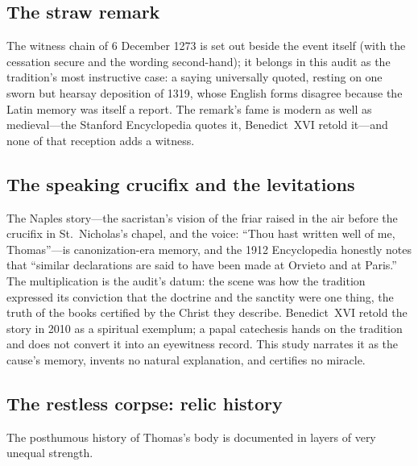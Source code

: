 \subsection{The straw remark}

The witness chain of 6 December 1273 is set out beside the event itself
(with the cessation secure and the wording second-hand); it belongs in
this audit as the tradition's most instructive case: a saying
universally quoted, resting on one sworn but hearsay deposition of
1319, whose English forms disagree because the Latin memory was itself
a report. The remark's fame is modern as well as medieval---the
Stanford Encyclopedia quotes it, Benedict~XVI retold it---and none of
that reception adds a witness.

\subsection{The speaking crucifix and the levitations}

The Naples story---the sacristan's vision of the friar raised in the
air before the crucifix in St.~Nicholas's chapel, and the voice: ``Thou
hast written well of me, Thomas''---is canonization-era memory, and the
1912 Encyclopedia honestly notes that ``similar declarations are said
to have been made at Orvieto and at Paris.'' The multiplication is the
audit's datum: the scene was how the tradition expressed its conviction
that the doctrine and the sanctity were one thing, the truth of the
books certified by the Christ they describe. Benedict~XVI retold the
story in 2010 as a spiritual exemplum; a papal catechesis hands on the
tradition and does not convert it into an eyewitness record. This study
narrates it as the cause's memory, invents no natural explanation, and
certifies no miracle.

\subsection{The restless corpse: relic history}

The posthumous history of Thomas's body is documented in layers of very
unequal strength.

